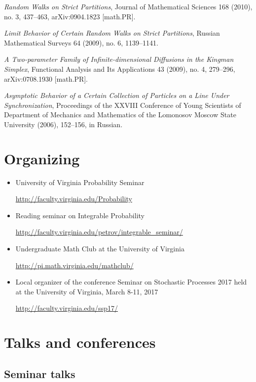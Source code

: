 \documentclass[letterpaper,11pt]{article}
\begin{document}
\begin{etaremune}
    \item  \emph{Random Walks on Strict Partitions}, Journal of Mathematical Sciences 168 (2010), no. 3, 437--463, arXiv:0904.1823 [math.PR].  
    \item  \emph{Limit Behavior of Certain Random Walks on Strict Partitions}, Russian Mathematical Surveys 64 (2009), no. 6, 1139--1141.
    \item  \emph{A Two-parameter Family of Infinite-dimensional Diffusions in the Kingman Simplex}, Functional Analysis and Its Applications 43 (2009), no. 4, 279--296, arXiv:0708.1930 [math.PR].
     \item 
    \emph{Asymptotic Behavior of a Certain Collection of Particles on a Line Under Synchronization}, Proceedings of the XXVIII Conference of Young Scientists of Department of Mechanics and Mathematics of the Lomonosov Moscow State University (2006), 152--156, in Russian.
\end{etaremune}

\section*{Organizing}

\begin{itemize}
	\item 
		University of Virginia Probability Seminar 

		\url{http://faculty.virginia.edu/Probability}
	\item 
		Reading seminar on Integrable Probability 

		\url{http://faculty.virginia.edu/petrov/integrable_seminar/}
	\item 
		Undergraduate Math Club
		at the University of Virginia

		\url{http://pi.math.virginia.edu/mathclub/}
	\item Local organizer of the conference 
		Seminar on Stochastic Processes 2017 
		held at the University of Virginia, March 8-11, 2017

		\url{http://faculty.virginia.edu/ssp17/}
\end{itemize}



\section*{Talks and conferences}

\subsection*{Seminar talks}
\end{document}
